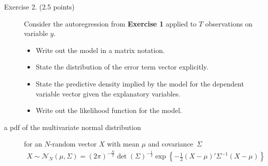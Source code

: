 \documentclass[12pt]{article}
\begin{document}
\begin{adjustwidth}{1cm}{1cm}
\newpage
\begin{description}
\item[Exercise 2. (2.5 points)] Consider the autoregression from \textbf{Exercise 1} applied to $T$ observations on variable $y$.
\begin{itemize}
\item Write out the model in a matrix notation.
\item State the distribution of the error term vector explicitly.
\item State the predictive density implied by the model for the dependent variable vector given the explanatory variables.
\item Write out the likelihood function for the model.
\end{itemize}
\item[a pdf of the multivariate normal distribution] for an $N$-random vector $X$ with mean $\mu$ and covariance~$\Sigma$
\begin{align}
X\sim\mathcal{N}_N\left(\mu, \Sigma\right) = (2\pi)^{-\frac{N}{2}}\det(\Sigma)^{-\frac{1}{2}}\exp\left\{-\frac{1}{2}\left(X-\mu\right)'\Sigma^{-1}\left(X-\mu\right) \right\}
\end{align} 


\end{description}
\end{adjustwidth}
\end{document}
